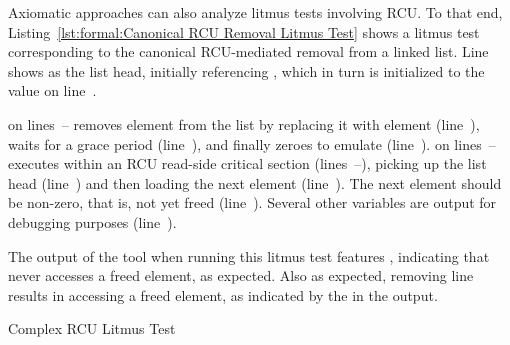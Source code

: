 \begin{lineref}
Axiomatic approaches can also analyze litmus tests involving RCU.
To that end,
Listing~\ref{lst:formal:Canonical RCU Removal Litmus Test}
shows a litmus test corresponding to the canonical RCU-mediated
removal from a linked list.
Line~ shows  as the list head, initially
referencing , which in turn is initialized to the value
 on line~.

 on lines~--
removes element  from the list by replacing it with element 
(line~),
waits for a grace period (line~),
and finally zeroes  to emulate  (line~).
 on lines~--
executes within an RCU read-side critical section
(lines~--),
picking up the list head (line~) and then
loading the next element (line~).
The next element should be non-zero, that is, not yet freed
(line~).
Several other variables are output for debugging purposes
(line~).

The output of the  tool when running this litmus test features
, indicating that  never accesses a freed element,
as expected.
Also as expected, removing line~ results in 
accessing a freed element, as indicated by the  in
the  output.
\end{lineref}

\begin{listing}[tb]

\caption{Complex RCU Litmus Test}
\label{lst:formal:Complex RCU Litmus Test}
\end{listing}


